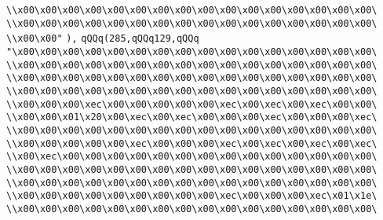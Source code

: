 \verb|\\x00\x00\x00\x00\x00\x00\x00\x00\x00\x00\x00\x00\x00\x00\x00\x00\|\newline
\verb|\\x00\x00\x00\x00\x00\x00\x00\x00\x00\x00\x00\x00\x00\x00\x00\x00\|\newline
\verb|\\x00\x00"|\newline
\verb|),|\newline
\verb|qQQq(285,qQQq129,qQQq|\newline
\verb|"\x00\x00\x00\x00\x00\x00\x00\x00\x00\x00\x00\x00\x00\x00\x00\x00\|\newline
\verb|\\x00\x00\x00\x00\x00\x00\x00\x00\x00\x00\x00\x00\x00\x00\x00\x00\|\newline
\verb|\\x00\x00\x00\x00\x00\x00\x00\x00\x00\x00\x00\x00\x00\x00\x00\x00\|\newline
\verb|\\x00\x00\x00\x00\x00\x00\x00\x00\x00\x00\x00\x00\x00\x00\x00\x00\|\newline
\verb|\\x00\x00\x00\xec\x00\x00\x00\x00\x00\xec\x00\xec\x00\xec\x00\x00\|\newline
\verb|\\x00\x00\x01\x20\x00\xec\x00\xec\x00\x00\x00\xec\x00\x00\x00\xec\|\newline
\verb|\\x00\x00\x00\x00\x00\x00\x00\x00\x00\x00\x00\x00\x00\x00\x00\x00\|\newline
\verb|\\x00\x00\x00\x00\x00\xec\x00\x00\x00\xec\x00\xec\x00\xec\x00\xec\|\newline
\verb|\\x00\xec\x00\x00\x00\x00\x00\x00\x00\x00\x00\x00\x00\x00\x00\x00\|\newline
\verb|\\x00\x00\x00\x00\x00\x00\x00\x00\x00\x00\x00\x00\x00\x00\x00\x00\|\newline
\verb|\\x00\x00\x00\x00\x00\x00\x00\x00\x00\x00\x00\x00\x00\x00\x00\x00\|\newline
\verb|\\x00\x00\x00\x00\x00\x00\x00\x00\x00\xec\x00\x00\x00\xec\x01\x1e\|\newline
\verb|\\x00\x00\x00\x00\x00\x00\x00\x00\x00\x00\x00\x00\x00\x00\x00\x00\|\newline
